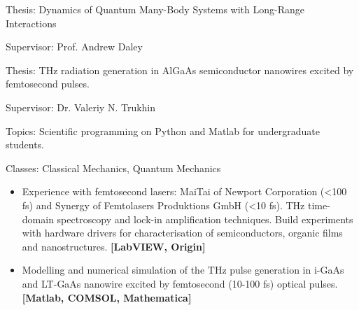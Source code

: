 \documentclass[10pt,a4paper,ragged2e,withhyper]{altacv}
\begin{document}


Thesis: Dynamics of Quantum Many-Body Systems with Long-Range Interactions

Supervisor: Prof. Andrew Daley

\divider


\divider


Thesis: THz radiation generation in AlGaAs semiconductor nanowires excited by femtosecond pulses.

Supervisor: Dr. Valeriy N. Trukhin


Topics: Scientific programming on Python and Matlab for undergraduate students.

\divider

Classes: Classical Mechanics, Quantum Mechanics

\divider


\begin{itemize}

    \item
    Experience with femtosecond lasers: MaiTai of Newport Corporation (<100 fs)
    and Synergy of Femtolasers Produktions GmbH (<10 fs).
    THz time-domain spectroscopy and lock-in amplification techniques.
    Build experiments with hardware drivers for
    characterisation of semiconductors, organic films and nanostructures.
    {\bf [LabVIEW, Origin]}

    \item
    Modelling and numerical simulation of the THz pulse generation in i-GaAs and LT-GaAs
    nanowire excited by femtosecond (10-100 fs) optical pulses.
    {\bf [Matlab, COMSOL, Mathematica]}

\end{itemize}
\end{document}

